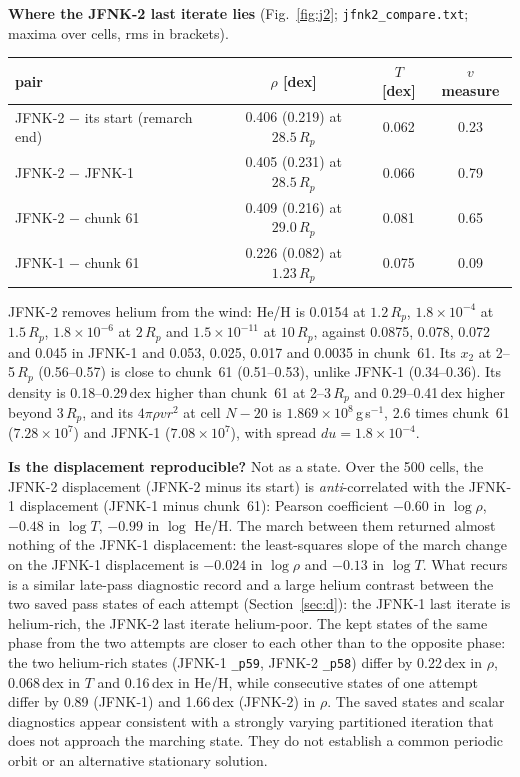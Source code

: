 \documentclass[english,a4paper]{my_memo}
\newcommand{\Rp}{R_p}
\begin{document}
\textbf{Where the JFNK-2 last iterate lies} (Fig.~\ref{fig:j2};
\texttt{jfnk2\_compare.txt}; maxima over cells, rms in brackets).
\begin{center}\small
\begin{tabular}{lccc}
\toprule
pair & $\rho$ [dex] & $T$ [dex] & $v$ measure \\
\midrule
JFNK-2 $-$ its start (remarch end) & 0.406 (0.219) at $28.5\,\Rp$ & 0.062 & 0.23 \\
JFNK-2 $-$ JFNK-1 & 0.405 (0.231) at $28.5\,\Rp$ & 0.066 & 0.79 \\
JFNK-2 $-$ chunk 61 & 0.409 (0.216) at $29.0\,\Rp$ & 0.081 & 0.65 \\
JFNK-1 $-$ chunk 61 & 0.226 (0.082) at $1.23\,\Rp$ & 0.075 & 0.09 \\
\bottomrule
\end{tabular}
\end{center}
JFNK-2 removes helium from the wind: He/H is 0.0154 at $1.2\,\Rp$,
$1.8\times10^{-4}$ at $1.5\,\Rp$, $1.8\times10^{-6}$ at $2\,\Rp$ and
$1.5\times10^{-11}$ at $10\,\Rp$, against 0.0875, 0.078, 0.072 and 0.045 in
JFNK-1 and 0.053, 0.025, 0.017 and 0.0035 in chunk~61. Its $x_2$ at
2--5\,$\Rp$ (0.56--0.57) is close to chunk~61 (0.51--0.53), unlike JFNK-1
(0.34--0.36). Its density is 0.18--0.29\,dex higher than chunk~61 at 2--3\,$\Rp$ and
0.29--0.41\,dex higher beyond $3\,\Rp$, and its
$4\pi\rho v r^2$ at cell $N-20$ is $1.869\times10^{8}$\,g\,s$^{-1}$, 2.6 times
chunk~61 ($7.28\times10^7$) and JFNK-1 ($7.08\times10^7$), with spread
$du=1.8\times10^{-4}$.

\textbf{Is the displacement reproducible?} Not as a state. Over the 500
cells, the JFNK-2 displacement (JFNK-2 minus its start) is
\emph{anti}-correlated with the JFNK-1 displacement (JFNK-1 minus chunk~61):
Pearson coefficient $-0.60$ in $\log\rho$, $-0.48$ in $\log T$, $-0.99$ in
$\log$ He/H. The march between them returned almost nothing of the JFNK-1
displacement: the least-squares slope of the march change on the JFNK-1
displacement is $-0.024$ in $\log\rho$ and $-0.13$ in $\log T$.
What recurs is a similar late-pass diagnostic record and a large
helium contrast between the two saved pass states of each attempt
(Section~\ref{sec:d}): the JFNK-1 last iterate is helium-rich, the JFNK-2
last iterate helium-poor. The
kept states of the same phase from the two attempts are closer to each
other than to the opposite phase: the two helium-rich states (JFNK-1
\texttt{\_p59}, JFNK-2 \texttt{\_p58}) differ by 0.22\,dex in $\rho$,
0.068\,dex in $T$ and 0.16\,dex in He/H, while consecutive states of one
attempt differ by 0.89 (JFNK-1) and 1.66\,dex (JFNK-2) in $\rho$. The saved states and scalar diagnostics appear consistent with a strongly
varying partitioned iteration that does not approach the marching state.
They do not establish a common periodic orbit or an alternative stationary
solution.
\end{document}
